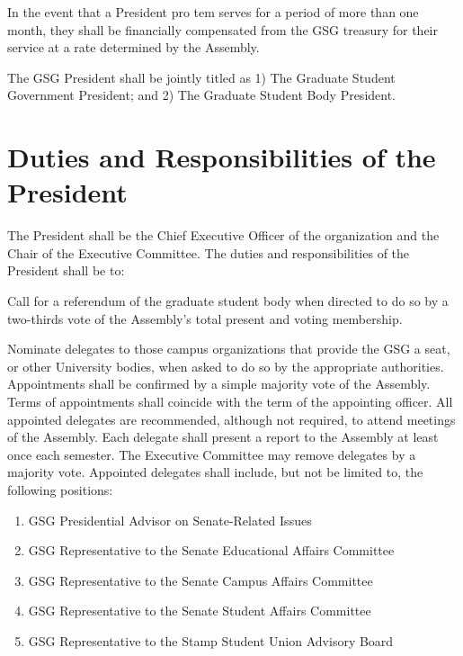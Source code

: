 \begin{bylaws-number}
\begin{bylaws-number}
    \item In the event that a President pro tem serves for a period of more than one month, they shall be financially compensated from the GSG treasury for their service at a rate determined by the Assembly.
  \end{bylaws-number}
  \item The GSG President shall be jointly titled as 1) The Graduate Student Government President; and 2) The Graduate Student Body President.
\end{bylaws-number}
\section{Duties and Responsibilities of the President}
\begin{bylaws-number}
  \item The President shall be the Chief Executive Officer of the organization and the Chair of the Executive Committee. The duties and responsibilities of the President shall be to:
  \begin{bylaws-number}
    \item Call for a referendum of the graduate student body when directed to do so by a two-thirds vote of the Assembly’s total present and voting membership.
    \item Nominate delegates to those campus organizations that provide the GSG a seat, or other University bodies, when asked to do so by the appropriate authorities. Appointments shall be confirmed by a simple majority vote of the Assembly. Terms of appointments shall coincide with the term of the appointing officer. All appointed delegates are recommended, although not required, to attend meetings of the Assembly. Each delegate shall present a report to the Assembly at least once each semester. The Executive Committee may remove delegates by a majority vote. Appointed delegates shall include, but not be limited to, the following positions:
    \begin{enumerate}[i]
      \item GSG Presidential Advisor on Senate-Related Issues
      \item GSG Representative to the Senate Educational Affairs Committee
      \item GSG Representative to the Senate Campus Affairs Committee
      \item GSG Representative to the Senate Student Affairs Committee
      \item GSG Representative to the Stamp Student Union Advisory Board

\end{enumerate}
\end{bylaws-number}
\end{bylaws-number}
